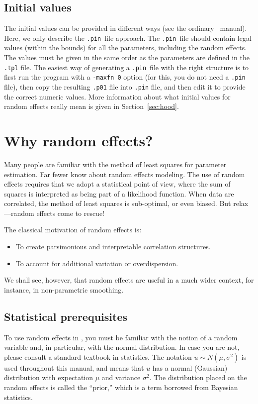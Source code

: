 \documentclass{admbmanual}
\begin{document}
\subsection{Initial values}

The initial values can be provided in different ways (see the ordinary \scAB\ manual). Here,
we only describe the \texttt{.pin}~file approach. The \texttt{.pin}~file should contain
legal values (within the bounds) for all the parameters, including the random effects.
The values must be given in the same order as the parameters are defined in the \texttt{.tpl} file.
The easiest way of generating a \texttt{.pin}~file with the right structure is to 
first run the program with a \texttt{-maxfn 0} option (for this, you do not need a \texttt{.pin} file), then
copy the resulting \texttt{.p01} file into \texttt{.pin} file, and then edit it to provide the correct numeric values.
More information about what initial values for random effects really mean is given in Section~\ref{sec:hood}.


\section{Why random effects?}

Many people are familiar with the method of least squares for parameter estimation. Far fewer know about random
effects modeling. The use of random effects requires that we adopt a statistical point of view, where the sum of
squares is interpreted as being part of a likelihood function. When data are correlated, the method of least
squares is sub-optimal, or even biased. But relax---random effects come to rescue! 

The classical motivation of random effects is:
\begin{itemize}
\item To create parsimonious and interpretable correlation structures.

\item To account for additional variation or overdispersion.
\end{itemize}
We shall see, however, that random effects are useful in a much wider context, for instance, in non-parametric smoothing. %


\subsection{Statistical prerequisites}

To use random effects in \scAB, you must be familiar with the notion of a random variable and, in particular, with
the normal distribution. In case you are not, please consult a standard textbook in statistics. The notation
$u\sim N(\mu ,\sigma ^{2})$ is used throughout this manual, and means that $u$ has a normal (Gaussian)
distribution with expectation $\mu$ and variance $\sigma ^{2}$. The distribution placed on the random effects
is called the ``prior,'' which is a term borrowed from Bayesian statistics.
\end{document}
